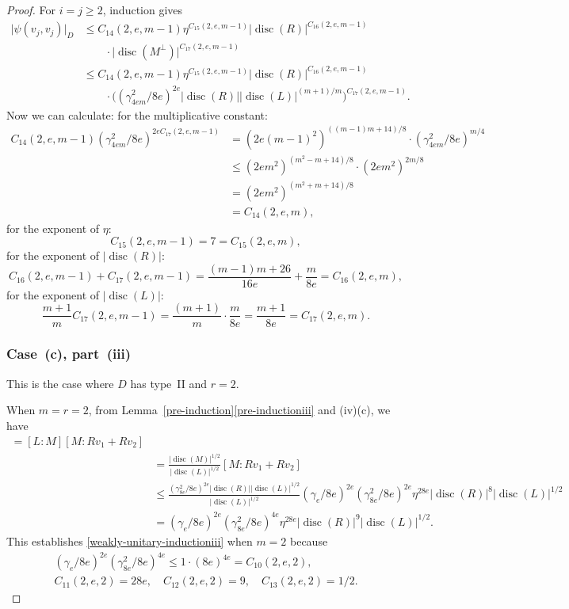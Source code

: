 \documentclass[11pt]{article}
\numberwithin{equation}{section}
\DeclareMathOperator{\disc}{disc}
\newcommand{\abs}[1]{\lvert #1 \rvert}
\begin{document}
\begin{proof}
For $i=j \geq 2$, induction gives
\begin{align*}
\abs{\psi(v_j, v_j)}_D
& \leq C_{14}(2,e,m-1) \eta^{C_{15}(2,e,m-1)} \abs{\disc(R)}^{C_{16} (2,e,m-1)}
\\& \qquad \cdot \abs{\disc(M^\perp)}^{C_{17}(2,e,m-1)}
\\& \leq C_{14}(2,e,m-1) \eta^{C_{15}(2,e,m-1)} \abs{\disc(R)}^{C_{16}(2,e,m-1)}
\\& \qquad \cdot \bigl( (\gamma_{4em}^2/8e)^{2e} \abs{\disc(R)} \abs{\disc(L)}^{(m+1)/m} \bigr)^{C_{17}(2,e,m-1)}.
\end{align*}
Now we can calculate:
for the multiplicative constant:
\begin{align*}
C_{14}(2,e,m-1) (\gamma_{4em}^2/8e)^{2eC_{17}(2,e,m-1)}
& = (2e(m-1)^2)^{((m-1)m+14)/8} \cdot (\gamma_{4em}^2/8e)^{m/4}
\\& \leq (2em^2)^{(m^2-m+14)/8} \cdot (2em^2)^{2m/8}
\\& = (2em^2)^{(m^2+m+14)/8}
\\& = C_{14}(2,e,m),
\end{align*}
for the exponent of $\eta$:
\[
C_{15}(2,e,m-1) = 7 = C_{15}(2,e,m),
\]
for the exponent of $\abs{\disc(R)}$:
\[
C_{16}(2,e,m-1) + C_{17}(2,e,m-1) = \frac{(m-1)m+26}{16e} + \frac{m}{8e}
= C_{16}(2, e, m),
\]
for the exponent of $\abs{\disc(L)}$:
\[
\frac{m+1}{m} C_{17}(2,e,m-1)= \frac{(m+1)}{m} \cdot \frac{m}{8e}
= \frac{m+1}{8e}
= C_{17}(2,e,m).
\]

\subsubsection*{Case~(c), part~(iii)}
This is the case where $D$ has type~II and $r=2$.

When $m=r=2$, from Lemma~\ref{pre-induction}\eqref{pre-inductioniii} and (iv)(c), we have
\begin{align*}
[L&:Rv_1 + Rv_2]
= [L:M][M:Rv_1 + Rv_2]
\\& = \frac{\abs{\disc(M)}^{1/2}}{\abs{\disc(L)}^{1/2}} [M:Rv_1 + Rv_2]
\\& \leq \frac{(\gamma_{8e}^2/8e)^{2e} \abs{\disc(R)} \abs{\disc(L)}^{1/2}}{\abs{\disc(L)}^{1/2}} (\gamma_e/8e)^{2e} (\gamma_{8e}^2/8e)^{2e} \eta^{28e} \abs{\disc(R)}^8 \abs{\disc(L)}^{1/2}
\\& = (\gamma_e/8e)^{2e} (\gamma_{8e}^2/8e)^{4e} \eta^{28e} \abs{\disc(R)}^9 \abs{\disc(L)}^{1/2}.
\end{align*}
This establishes \eqref{weakly-unitary-inductioniii} when $m=2$ because
\begin{gather*}
(\gamma_e/8e)^{2e} (\gamma_{8e}^2/8e)^{4e}
\leq 1 \cdot (8e)^{4e}
= C_{10}(2,e,2),
\\ C_{11}(2,e,2) = 28e,
\quad C_{12}(2,e,2) = 9,
\quad C_{13}(2,e,2) = 1/2.
\end{gather*}


\end{proof}
\end{document}
